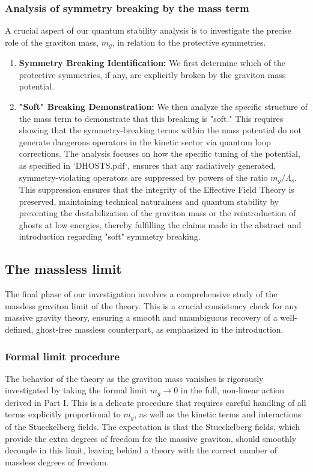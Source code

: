 \documentclass[twocolumn]{aastex631}
\begin{document}
\subsubsection{Analysis of symmetry breaking by the mass term}
A crucial aspect of our quantum stability analysis is to investigate the precise role of the graviton mass, $m_g$, in relation to the protective symmetries.
\begin{enumerate}
    \item \textbf{Symmetry Breaking Identification:} We first determine which of the protective symmetries, if any, are explicitly broken by the graviton mass potential.
    \item \textbf{"Soft" Breaking Demonstration:} We then analyze the specific structure of the mass term to demonstrate that this breaking is "soft." This requires showing that the symmetry-breaking terms within the mass potential do not generate dangerous operators in the kinetic sector via quantum loop corrections. The analysis focuses on how the specific tuning of the potential, as specified in `DHOSTS.pdf`, ensures that any radiatively generated, symmetry-violating operators are suppressed by powers of the ratio $m_g/\Lambda_s$. This suppression ensures that the integrity of the Effective Field Theory is preserved, maintaining technical naturalness and quantum stability by preventing the destabilization of the graviton mass or the reintroduction of ghosts at low energies, thereby fulfilling the claims made in the abstract and introduction regarding "soft" symmetry breaking.
\end{enumerate}

\subsection{The massless limit}
The final phase of our investigation involves a comprehensive study of the massless graviton limit of the theory. This is a crucial consistency check for any massive gravity theory, ensuring a smooth and unambiguous recovery of a well-defined, ghost-free massless counterpart, as emphasized in the introduction.

\subsubsection{Formal limit procedure}
The behavior of the theory as the graviton mass vanishes is rigorously investigated by taking the formal limit $m_g \to 0$ in the full, non-linear action derived in Part I. This is a delicate procedure that requires careful handling of all terms explicitly proportional to $m_g$, as well as the kinetic terms and interactions of the Stueckelberg fields. The expectation is that the Stueckelberg fields, which provide the extra degrees of freedom for the massive graviton, should smoothly decouple in this limit, leaving behind a theory with the correct number of massless degrees of freedom.
\end{document}
